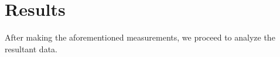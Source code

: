 \chapter{Results}

\label{chapter5}

After making the aforementioned measurements, we proceed to analyze the resultant data.
